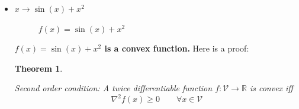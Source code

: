 \documentclass[paper=a4, fontsize=11pt]{scrartcl} %
\numberwithin{equation}{section} %
\numberwithin{figure}{section} %
\numberwithin{table}{section} %
\newtheorem{theorem}{Theorem}
\begin{document}
\begin{itemize}
By the theorem, for $f(x) = x^2$
\begin{align}
	f(x) + \nabla f(x)^T(y-x) &= x^2 + 2 x (y - x) \\
	&= x^2 + 2xy - 2x^2 \\
	&= 2xy - x^2 \\
	f(y) - f(x) - \nabla f(x)^T(y - x) &= y^2 - 2xy + x^2 \\ 
	&= (y - x)^2 \geq 0 \\
	\therefore 	f(y) \geq f(x) + \nabla f(x)^T(y-x) \label{eq:firstorder}
\end{align}

By (\ref{eq:firstorder}) and Theorem \ref{thm:firstorder}, $f(x) = x^2$ is a convex function. 
	
	\item $x \rightarrow \sin(x) + x^2$ 

\begin{figure}[H]
\vspace{-5mm}
\caption{$f(x) = \sin(x) + x^2$\label{fig:sinxplusxsq}}
\noindent{}
\end{figure}

\textbf{$f(x) = \sin(x) + x^2$ is a convex function.} Here is a proof: \\
	
\begin{theorem} \label{thm:secondorder}

Second order condition: A twice differentiable function $f: \mathcal{V} \rightarrow \mathbb{R}$ is convex iff
\begin{equation}
	\nabla^2 f(x) \geq 0 \qquad \forall x \in \mathcal{V}
\end{equation}
\end{theorem}


\end{itemize}
\end{document}

